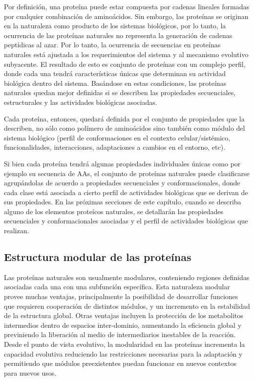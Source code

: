 Por definición, una proteína puede estar compuesta por cadenas lineales formadas por cualquier combinación de aminoácidos.
Sin embargo, las proteínas se originan en la naturaleza como producto de los sistemas biológicos, por lo tanto, 
la ocurrencia de las proteínas naturales no representa la generación de cadenas peptídicas al azar. 
Por lo tanto, la ocurrencia de secuencias en proteínas naturales está ajustada a los requerimientos del sistema y al mecanismo evolutivo subyacente. 
El resultado de esto es conjunto de proteínas con un complejo perfil, donde cada una tendrá características únicas que determinan su actividad biológica dentro del sistema.
Basándose en estas condiciones, las proteínas naturales quedan mejor definidas si se describen las propiedades secuenciales, estructurales y las actividades biológicas asociadas. 

Cada proteína, entonces, quedará definida por el conjunto de propiedades que la describen, no sólo como polímero de aminoácidos 
sino también como módulo del sistema biológico (perfil de conformaciones en el contexto celular/sistémico, funcionalidades, interacciones, adaptaciones a cambios en el entorno, etc). 

Si bien cada proteína tendrá algunas propiedades individuales únicas como por ejemplo su secuencia de AAs, 
el conjunto de proteínas naturales puede clasificarse agrupándolas de acuerdo a propiedades secuenciales y conformacionales, 
donde cada clase está asociada a cierto perfil de actividades biológicas que se derivan de sus propiedades.
En las próximas secciones de este capítulo, cuando se describa alguno de los elementos proteícos naturales, 
se detallarán las propiedades secuenciales y conformacionales asociadas y el perfil de actividades biológicas que realizan.












\subsection{Estructura modular de las proteínas}

Las proteínas naturales son usualmente modulares, conteniendo regiones definidas asociadas cada una con una subfunción específica.
Esta naturaleza modular provee muchas ventajas, principalmente la posibilidad de desarrollar funciones que requieren cooperación de distintos módulos, y un incremento en la estabilidad de la estructura global.
Otras ventajas incluyen la protección de los metabolitos intermedios dentro de espacios inter-dominio, aumentando la eficiencia global y previniendo la liberación al medio de intermediarios inestables de la reacción.  
Desde el punto de vista evolutivo, la modularidad en las proteínas incrementa la capacidad evolutiva reduciendo las restricciones necesarias 
para la adaptación y permitiendo que módulos preexistentes puedan funcionar en nuevos contextos para nuevos usos.

